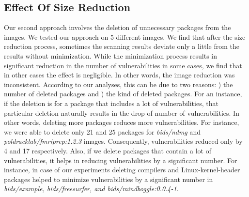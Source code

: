 \documentclass[a4paper,num-refs]{oup-contemporary}
\newcommand{\rom}[1]{\lowercase\expandafter{\romannumeral #1\relax}}
\begin{document}

\subsection{Effect Of Size Reduction}

Our second approach involves the deletion of unnecessary packages from the images.
We tested our approach on 5 different images. We find that
after the size reduction process, sometimes the scanning results deviate only a little from the results
without minimization. While the minimization process results in significant reduction
in the number of vulnerabilities in some cases, we find that in other cases the effect
is negligible. In other words, the image reduction was inconsistent.
According to our analyses, this can be due to two reasons: \rom{1}) the number of
deleted packages
and \rom{2}) the kind of deleted packages. 
For an instance, if the deletion is for a package that includes a lot of vulnerabilities,
that particular deletion naturally results in the drop of number of vulnerabilities.
In other
words, deleting more packages reduces more vulnerabilities. 
For instance, we were able to delete only 21 and 25 packages for 
\textit{bids/ndmg} and \textit{poldracklab/fmriprep:1.2.3} images. Consequently, vulnerabilities
reduced only by 4 and 17 respectively. 
Also, if we delete packages that contain a lot of vulnerabilities, it helps in reducing
vulnerabilities by a significant number. For instance, in case of our experiments
deleting compilers and Linux-kernel-header packages helped to minimize vulnerabilities
by a significant number in \textit{bids/example, bids/freesurfer, and bids/mindboggle:0.0.4-1}. 
\end{document}
